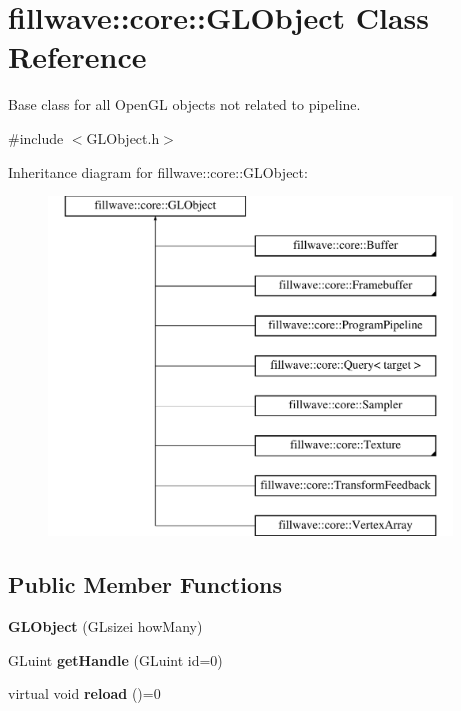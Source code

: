 \hypertarget{classfillwave_1_1core_1_1GLObject}{}\section{fillwave\+:\+:core\+:\+:G\+L\+Object Class Reference}
\label{classfillwave_1_1core_1_1GLObject}


Base class for all Open\+G\+L objects not related to pipeline.  




{\ttfamily \#include $<$G\+L\+Object.\+h$>$}

Inheritance diagram for fillwave\+:\+:core\+:\+:G\+L\+Object\+:\begin{figure}[H]
\begin{center}
\leavevmode
\includegraphics[height=9.000000cm]{classfillwave_1_1core_1_1GLObject}
\end{center}
\end{figure}
\subsection*{Public Member Functions}
\begin{DoxyCompactItemize}
\item 
\hypertarget{classfillwave_1_1core_1_1GLObject_adf54dafb1a5b9f1ef5e6f6a4a995abd1}{}{\bfseries G\+L\+Object} (G\+Lsizei how\+Many)\label{classfillwave_1_1core_1_1GLObject_adf54dafb1a5b9f1ef5e6f6a4a995abd1}

\item 
\hypertarget{classfillwave_1_1core_1_1GLObject_ae0e1c865347204ed8353cc7a802640dd}{}G\+Luint {\bfseries get\+Handle} (G\+Luint id=0)\label{classfillwave_1_1core_1_1GLObject_ae0e1c865347204ed8353cc7a802640dd}

\item 
\hypertarget{classfillwave_1_1core_1_1GLObject_a7985f8f984a1b6f6b018cdedcbab387c}{}virtual void {\bfseries reload} ()=0\label{classfillwave_1_1core_1_1GLObject_a7985f8f984a1b6f6b018cdedcbab387c}

\end{DoxyCompactItemize}

